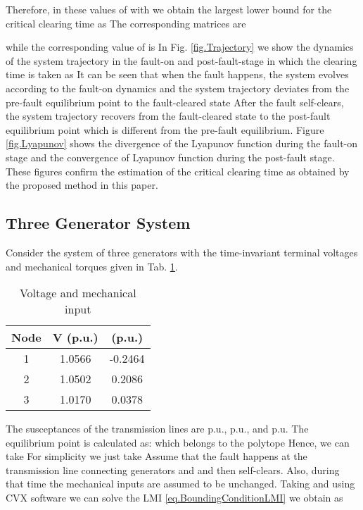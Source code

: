 \documentclass[final]{IEEEtran}
\begin{document}
Therefore, in these values of  with   we obtain
the largest lower bound for the critical clearing time as
 The corresponding matrices  are

while the corresponding  value of  is
 In Fig. \ref{fig.Trajectory} we show the dynamics of the
system trajectory in the fault-on and post-fault-stage in which
the clearing time is taken as  It can be seen that when the
fault happens, the system evolves according to the fault-on
dynamics and the system trajectory deviates from the pre-fault
equilibrium point  to the fault-cleared state
 After the fault self-clears, the system
trajectory recovers from the fault-cleared state
 to the post-fault equilibrium point
 which is different from the pre-fault
equilibrium. Figure \ref{fig.Lyapunov} shows the divergence of the
Lyapunov function during the fault-on stage and the convergence of
Lyapunov function during the post-fault stage. These figures
confirm the estimation of the critical clearing time as obtained
by the proposed method in this paper.



\subsection{Three Generator System}

Consider the system of three generators with the time-invariant
terminal voltages and mechanical torques given in Tab.
\ref{tab.data3machine}.

\begin{table}[ht!]
\centering
\begin{tabular}{|c|c|c|}
  \hline
Node & V (p.u.) &  (p.u.) \\
  \hline
  1 & 1.0566 & -0.2464 \\
  2 & 1.0502 & 0.2086 \\
  3 & 1.0170 & 0.0378 \\
  \hline
\end{tabular}
\caption{Voltage and mechanical input} \label{tab.data3machine}
\end{table}

The susceptances of the transmission lines are 
p.u.,  p.u., and  p.u. The
equilibrium point is calculated as:  which belongs to the polytope  Hence, we can take 
   For simplicity we just take  Assume that the fault
   happens at the transmission line connecting
   generators  and  and then self-clears. Also, during that time the mechanical inputs are assumed to be unchanged.
   Taking  and using CVX software we can solve the LMI
   \eqref{eq.BoundingConditionLMI} we obtain  as
   
\end{document}
